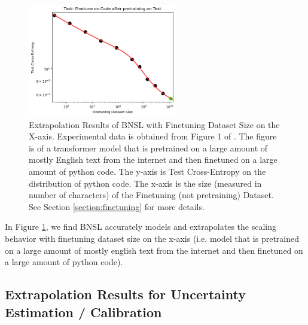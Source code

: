 \documentclass{article} %
\begin{document}
\begin{figure}[htbp]
    \centering
\includegraphics[width=0.58\textwidth]{figures/finetuning/language_code_finetuning.png}
    \caption{
Extrapolation Results of BNSL with Finetuning Dataset Size on the X-axis. Experimental data is obtained from Figure 1 of \cite{2021arXiv210201293H}. The figure is of a transformer model that is pretrained on a large amount of mostly English text from the internet and then finetuned on a large amount of python code. The y-axis is Test Cross-Entropy on the distribution of python code. The x-axis is the size (measured in number of characters) of the Finetuning (not pretraining) Dataset. See Section \ref{section:finetuning} for more details.
    }
    \label{fig:finetuning}
\end{figure}

In Figure \ref{fig:finetuning}, we find BNSL accurately models and extrapolates the scaling behavior with finetuning dataset size on the x-axis (i.e. model that is pretrained on a large amount of mostly english text from the internet and then finetuned on a large amount of python code).

\subsection{Extrapolation Results for Uncertainty Estimation / Calibration}
\label{section:uncertainty}
\end{document}
